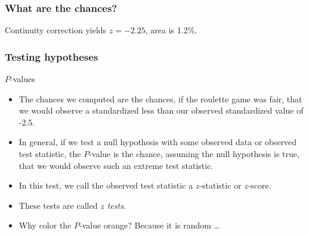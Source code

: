 \documentclass[handout]{beamer}
\begin{document}


   \begin{frame}
   \frametitle{What are the chances?}
   \begin{center}
   \end{center}
   Continuity correction yields $z=-2.25$, area is 1.2\%.
   \end{frame}


   \begin{frame} \frametitle{Testing hypotheses}

   \begin{block}
   {$P$-values}
   \begin{itemize}

   \item The chances we computed are the chances, if the roulette game was fair, that we would observe a standardized less than our observed standardized value of {\color{orange} -2.5}.

   \item In general, if we test a null hypothesis with
   some {\color{orange} observed data} or {\color{orange} observed test statistic}, the {\color{orange} $P$-value} is
   the chance, assuming the null hypothesis is true, that
   we would observe such an extreme test statistic.

   \item In this test, we call the {\color{orange} observed test statistic}
   a {\color{orange} $z$-statistic} or {\color{orange} $z$-score}.
   \item These tests are called {\em \color{blue} $z$ tests}.
   \item Why color the {\color{orange} $P$-value} orange? Because
   it is random \dots

   \end{itemize}
   \end{block}
   \end{frame}
\end{document}
